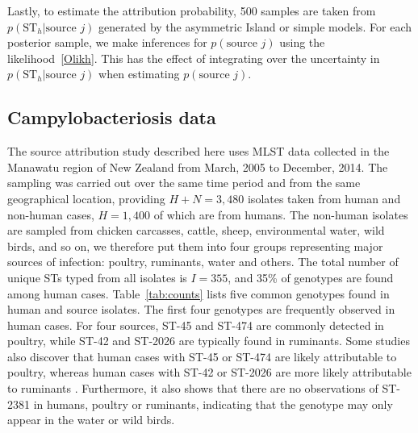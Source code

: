 \documentclass[times, doublespace]{simauth}%
\begin{document}
Lastly, to estimate the attribution probability, 500 samples are taken from $p(\text{ST}_h \vert \text{source }j)$ generated by the asymmetric Island or simple models. For each posterior sample, we make inferences for $p(\text{source }j)$ using the likelihood~\eqref{Olikh}. This has the effect of integrating over the uncertainty in $p(\text{ST}_h \vert \text{source }j)$ when estimating $p(\text{source }j)$.

\subsection{Campylobacteriosis data}

The source attribution study described here uses MLST data collected in the Manawatu region of New Zealand from March, 2005 to December, 2014. The sampling was carried out over the same time period and from the same geographical location, providing $H+N=3,480$ isolates taken from human and non-human cases, $H=1,400$ of which are from humans. The non-human isolates are sampled from chicken carcasses, cattle, sheep, environmental water, wild birds, and so on, we therefore put them into four groups representing major sources of infection: poultry, ruminants, water and others. The total number of unique STs typed from all isolates is $I=355$, and 35\% of genotypes are found among human cases. Table~\ref{tab:counts} lists five common genotypes found in human and source isolates. The first four genotypes are frequently observed in human cases. For four sources, ST-45 and ST-474 are commonly detected in poultry, while ST-42 and ST-2026 are typically found in ruminants. Some studies also discover that human cases with ST-45 or ST-474 are likely attributable to poultry, whereas human cases with ST-42 or ST-2026 are more likely attributable to ruminants \cite{Muell, Coll, Cart}. Furthermore, it also shows that there are no observations of ST-2381 in humans, poultry or ruminants, indicating that the genotype may only appear in the water or wild birds.
\end{document}
